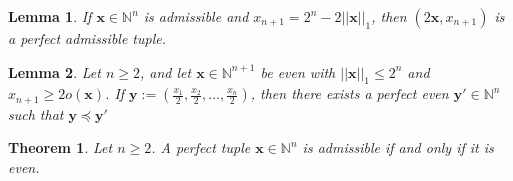 \documentclass[10pt,a4paper]{amsart}
\newtheorem{theorem}{Theorem}
\newtheorem{lemma}{Lemma}
\begin{document}
\begin{lemma}\label{l:admissible}
If $\bm{x} \in \mathbb{N}^{n}$ is admissible and $x_{n+1} = 2^{n} - 2||\bm{x}||_1$, then $(2\bm{x},x_{n+1})$ is a perfect admissible tuple.
\end{lemma}

\begin{lemma}\label{l:first}
Let $n\geq 2$, and let $\bm{x} \in \mathbb{N}^{n+1}$ be even with $||\bm{x}||_1 \leq 2^{n}$ and $x_{n+1} \geq 2 o(\bm{x})$. If $\bm{y} := \left(\frac{x_1}{2},\frac{x_2}{2}, \ldots, \frac{x_n}{2}\right)$, then there exists a perfect even $\bm{y'} \in \mathbb{N}^n$ such that $\bm{y} \preceq \bm{y'}$
\end{lemma}

\begin{theorem}\label{t:perfect}
Let $n \geq 2$. A perfect tuple $\bm{x} \in \mathbb{N}^n$ is admissible if and only if it is even.
\end{theorem}
\end{document}
